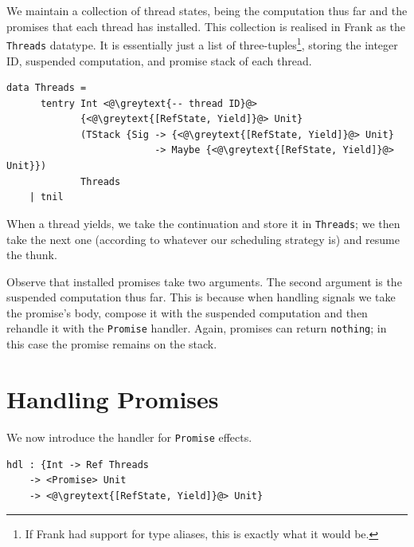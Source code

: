\documentclass[msc,deptreport,cs]{infthesis} %
\newcommand{\code}[1]{\lstinline{#1}}
\newcommand{\greytext}[1]{\textcolor{black!40}{#1}}
\newcommand\yield{\textsf{yield}\xspace}
\begin{document}
We maintain a collection of thread states, being the computation thus far and
the promises that each thread has installed.
%
This collection is realised in Frank as the \code{Threads} datatype. It is
essentially just a list of three-tuples\footnote{If Frank had support for type
  aliases, this is exactly what it would be.}, storing the integer ID, suspended
computation, and promise stack of each thread.

\begin{lstlisting}
data Threads =
      tentry Int <@\greytext{-- thread ID}@>
             {<@\greytext{[RefState, Yield]}@> Unit}
             (TStack {Sig -> {<@\greytext{[RefState, Yield]}@> Unit}
                          -> Maybe {<@\greytext{[RefState, Yield]}@> Unit}})
             Threads
    | tnil
\end{lstlisting}

When a thread \yield{}s, we take the continuation and store it in
\code{Threads}; we then take the next one (according to whatever our scheduling
strategy is) and resume the thunk.

Observe that installed promises take two arguments. The second
argument is the suspended computation thus far. This is because when handling
signals we take the promise's body, compose it with the suspended computation
and then rehandle it with the \code{Promise} handler. Again, promises can return
\code{nothing}; in this case the promise remains on the stack.



\section{Handling Promises}
\label{sec:handling-promises}

We now introduce the handler for \code{Promise} effects.

\begin{lstlisting}
hdl : {Int -> Ref Threads
    -> <Promise> Unit
    -> <@\greytext{[RefState, Yield]}@> Unit}
\end{lstlisting}
\end{document}

